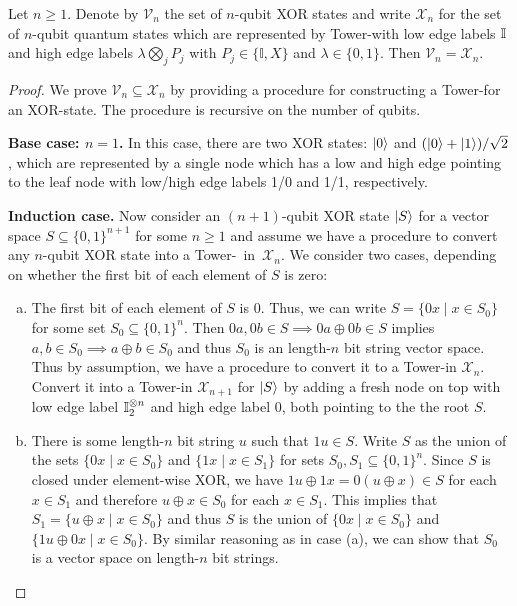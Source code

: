 \begin{proposition}
    \label{lemma:vector-space-x-limdd}
    Let $n\geq 1$.
    Denote by $\mathcal{V}_n$ the set of $n$-qubit XOR states and write $\mathcal{X}_n$ for the set of $n$-qubit quantum states which are represented by Tower-\limdds with low edge labels $\id$ and high edge labels $\lambda \bigotimes_j P_j$ with $P_j \in \{\mathbb I, X\}$ and $\lambda \in \{0, 1\}$.
    Then $\mathcal{V}_n = \mathcal{X}_n$.
\end{proposition}
\begin{proof}
    We prove $\mathcal{V}_n \subseteq \mathcal{X}_n$ by providing a procedure for constructing a Tower-\limdd for an XOR-state.
    The procedure is recursive on the number of qubits.

	\textbf{Base case: $n=1$.} In this case, there are two XOR states: $\ket{0}$ and $(\ket{0} + \ket{1}) / \sqrt{2}$, which are represented by a single node which has a low and high edge pointing to the leaf node with low/high edge labels 1/0 and 1/1, respectively.
	
	\textbf{Induction case. }Now consider an $(n+1)$-qubit XOR state $\ket{S}$ for a vector space $S\subseteq \{0,1\}^{n+1}$ for some $n\geq 1$ and assume we have a procedure to convert any $n$-qubit XOR state into a Tower-\limdd~in~$ \mathcal{X}_n$. 
We consider two cases, depending on whether the first bit of each element of $S$ is zero:
    \begin{enumerate}[(a)]
        \item{
                The first bit of each element of $S$ is $0$.
                Thus, we can write $S = \{0x \mid  x \in S_0\}$ for some set $S_0\subseteq\{0, 1\}^n$.
            Then $0a,0b\in S \implies 0a\oplus 0b\in S$ implies $a,b\in S_0 \implies a\oplus b\in S_0$ and thus $S_0$ is an length-$n$ bit string vector space.
            Thus by assumption, we have a procedure to convert it to a Tower-\limdd in $\mathcal{X}_n$.
            Convert it into a Tower-\limdd in $\mathcal{X}_{n+1}$ for $\ket{S}$ by adding a fresh node on top with low edge label $\id[2]^{\otimes n}$ and high edge label $0$, both pointing to the the root $S$.
            }
         \item{
                 There is some length-$n$ bit string $u$ such that $1u\in S$.
                 Write $S$ as the union of the sets $\{0x \mid x \in S_0\}$ and $\{1x \mid x\in S_1\}$ for sets $S_0, S_1 \subseteq \{0,1\}^n$.
                 Since $S$ is closed under element-wise XOR, we have $1u \oplus 1x = 0(u\oplus x) \in S$ for each $x\in S_1$ and therefore $u\oplus x \in S_0$ for each $x \in S_1$.
                 This implies that $S_1 = \{u\oplus x\mid x\in S_0\}$ and thus $S$ is the union of $\{0x \mid  x \in S_0\}$ and $\{1u \oplus 0x\mid x\in S_0\}$.
                 By similar reasoning as in case (a), we can show that $S_0$ is a vector space on length-$n$ bit strings.
                 
}
\end{enumerate}
\end{proof}

